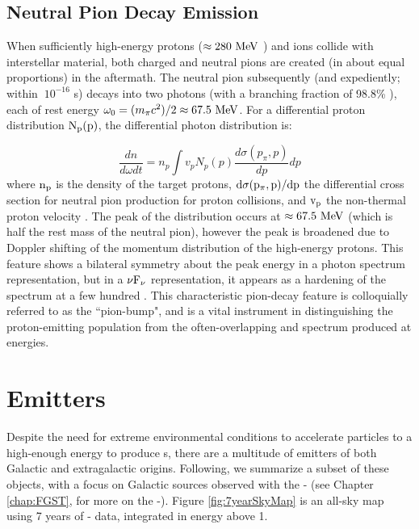 

\subsection{Neutral Pion Decay Emission}\label{gamAstr:PP}
When sufficiently high-energy protons ($\approx 280~\mathrm{MeV}{}$ \cite{Dermer13}) and ions collide with interstellar material, both charged and neutral pions are created (in about equal proportions) in the aftermath. The neutral pion subsequently (and expediently; within $~10^{-16}$ s) decays into two \gam{} photons (with a branching fraction of 98.8\% \cite{Beringer12}), each of rest energy $\omega_0 =(m_{\pi}c^2)/2\approx 67.5~\mathrm{MeV}{}$. For a differential proton distribution ${\rm N_p(p)}$, the differential photon distribution is:

\begin{equation}
\frac{d n}{d \omega d t} = 
n_p \int v_p N_p(p) 
\frac{d \sigma(p_\pi, p)}{d p}dp
\end{equation}
where ${\rm n_p}$ is the density of the target protons, ${\rm d \sigma(p_\pi, p)/dp}$ the differential cross section for neutral pion production for proton collisions, and ${\rm v_p}$ the non-thermal proton velocity \citep{Hillier84,Dermer86,Aharonian00}. The peak of the distribution occurs at $\approx 67.5~\mathrm{MeV}{}$ (which is half the rest mass of the neutral pion), however the peak is broadened due to Doppler shifting of the momentum distribution of the high-energy protons. This feature shows a bilateral symmetry about the peak energy in a photon spectrum representation, but in a ${\rm \nu F_\nu}$ representation, it appears as a hardening of the spectrum at a few hundred\mev{} \citep{Stecker71,Dermer13}. This characteristic pion-decay feature is colloquially referred to as the ``pion-bump", and is a vital instrument in distinguishing the proton-emitting population from the often-overlapping \ic{} and \brems{} spectrum produced at \gam{} energies. 

\section{\gam{} Emitters}\label{gamAstr:Sources}
Despite the need for extreme environmental conditions to accelerate particles to a high-enough energy to produce \gam{}s, there are a multitude of \gam{} emitters of both Galactic and extragalactic origins. Following, we summarize a subset of these \gam{} objects, with a focus on Galactic \gam{} sources observed with the \Fermi{}-\lat{}  (see Chapter \ref{chap:FGST}, for more on the \Fermi{}-\lat{}). Figure \ref{fig:7yearSkyMap} is an all-sky map using 7 years of  \Fermi{}-\lat{} data, integrated in energy above 1\gev{}. 

